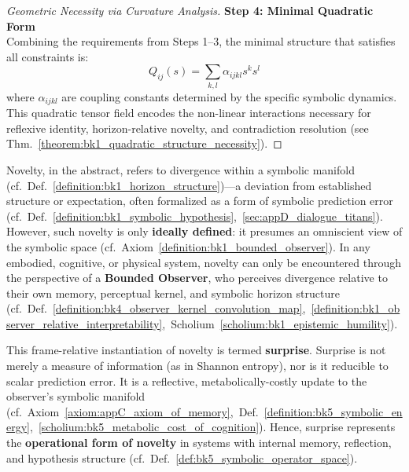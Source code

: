 \begin{proof}[Geometric Necessity via Curvature Analysis]
\textbf{Step 4: Minimal Quadratic Form} \\
Combining the requirements from Steps 1–3, the minimal structure that satisfies all constraints is:
\[
Q_{ij}(s) = \sum_{k,l} \alpha_{ijkl} s^k s^l
\]
where $\alpha_{ijkl}$ are coupling constants determined by the specific symbolic dynamics. This quadratic tensor field encodes the non-linear interactions necessary for reflexive identity, horizon-relative novelty, and contradiction resolution (see Thm.~\ref{theorem:bk1_quadratic_structure_necessity}).
\end{proof}

\begin{tcolorbox}[colback=blue!5!white, colframe=blue!75!black, title=From Novelty to Surprise: The Operational Definition for Observer-Framed Divergence]
\label{definition:bk1_observer_framed_divergence}
Novelty, in the abstract, refers to divergence within a symbolic manifold (cf.~Def.~\ref{definition:bk1_horizon_structure})—a deviation from established structure or expectation, often formalized as a form of symbolic prediction error (cf.~Def.~\ref{definition:bk1_symbolic_hypothesis},~\ref{sec:appD_dialogue_titans}). However, such novelty is only \textbf{ideally defined}: it presumes an omniscient view of the symbolic space (cf.~Axiom~\ref{definition:bk1_bounded_observer}). In any embodied, cognitive, or physical system, novelty can only be encountered through the perspective of a \textbf{Bounded Observer}, who perceives divergence relative to their own memory, perceptual kernel, and symbolic horizon structure (cf.~Def.~\ref{definition:bk4_observer_kernel_convolution_map},~\ref{definition:bk1_observer_relative_interpretability},~Scholium~\ref{scholium:bk1_epistemic_humility}).

This frame-relative instantiation of novelty is termed \textbf{surprise}. Surprise is not merely a measure of information (as in Shannon entropy), nor is it reducible to scalar prediction error. It is a reflective, metabolically-costly update to the observer’s symbolic manifold (cf.~Axiom~\ref{axiom:appC_axiom_of_memory},~Def.~\ref{definition:bk5_symbolic_energy},~\ref{scholium:bk5_metabolic_cost_of_cognition}). Hence, surprise represents the \textbf{operational form of novelty} in systems with internal memory, reflection, and hypothesis structure (cf.~Def.~\ref{def:bk5_symbolic_operator_space}).


\end{tcolorbox}
